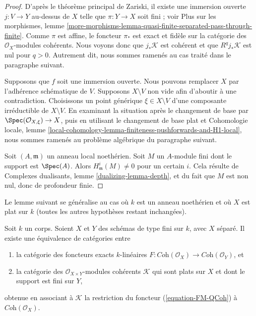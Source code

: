 \begin{proof}
D'après le théorème principal de Zariski, il existe une immersion ouverte
$j : V \to Y$ au-dessus de $X$ telle que $\pi : Y \to X$ soit fini ; voir
Plus sur les morphismes, lemme
\ref{more-morphisms-lemma-quasi-finite-separated-pass-through-finite}.
Comme $\pi$ est affine, le foncteur $\pi_*$ est exact et fidèle sur la
catégorie des $\mathcal{O}_X$-modules cohérents.
Nous voyons donc que $j_*\mathcal{K}$ est cohérent et que
$R^qj_*\mathcal{K}$ est nul pour $q > 0$.
Autrement dit, nous sommes ramenés au cas traité dans le paragraphe suivant.

\medskip\noindent
Supposons que $f$ soit une immersion ouverte. Nous pouvons remplacer $X$ par
l'adhérence schématique de $V$. Supposons $X \setminus V$ non vide afin
d'aboutir à une contradiction. Choisissons un point générique
$\xi \in X \setminus V$ d'une composante irréductible de $X \setminus V$.
En examinant la situation après le changement de base par
$\Spec(\mathcal{O}_{X, \xi}) \to X$, puis en utilisant le changement de base
plat et Cohomologie locale, lemme
\ref{local-cohomology-lemma-finiteness-pushforwards-and-H1-local},
nous sommes ramenés au problème algébrique du paragraphe suivant.

\medskip\noindent
Soit $(A, \mathfrak m)$ un anneau local noethérien. Soit $M$ un $A$-module
fini dont le support est $\Spec(A)$. Alors
$H^i_\mathfrak m(M) \not = 0$ pour un certain $i$. Cela résulte de
Complexes dualisants, lemme \ref{dualizing-lemma-depth}, et du fait que
$M$ est non nul, donc de profondeur finie.
\end{proof}

\noindent
Le lemme suivant se généralise au cas où $k$ est un anneau noethérien et où
$X$ est plat sur $k$ (toutes les autres hypothèses restant inchangées).

\begin{lemma}
\label{lemma-functor-coherent-over-field}
Soit $k$ un corps. Soient $X$ et $Y$ des schémas de type fini sur $k$,
avec $X$ séparé. Il existe une équivalence de catégories entre
\begin{enumerate}
\item la catégorie des foncteurs exacts $k$-linéaires
$F : \textit{Coh}(\mathcal{O}_X) \to \textit{Coh}(\mathcal{O}_Y)$, et
\item la catégorie des $\mathcal{O}_{X \times Y}$-modules cohérents
$\mathcal{K}$ qui sont plats sur $X$ et dont le support est fini sur $Y$,
\end{enumerate}
obtenue en associant à $\mathcal{K}$ la restriction du foncteur
(\ref{equation-FM-QCoh}) à $\textit{Coh}(\mathcal{O}_X)$.
\end{lemma}

